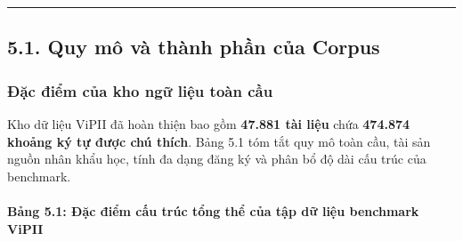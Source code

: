 \documentclass[
  11pt,
  a4paper,
]{article}
\begin{document}
\begin{center}\rule{0.5\linewidth}{0.5pt}\end{center}

\subsection{5.1. Quy mô và thành phần của
Corpus}\label{quy-muxf4-vuxe0-thuxe0nh-phux1ea7n-cux1ee7a-corpus}

\subsubsection{Đặc điểm của kho ngữ liệu toàn
cầu}\label{ux111ux1eb7c-ux111iux1ec3m-cux1ee7a-kho-ngux1eef-liux1ec7u-touxe0n-cux1ea7u}

Kho dữ liệu ViPII đã hoàn thiện bao gồm \textbf{47.881 tài liệu} chứa
\textbf{474.874 khoảng ký tự được chú thích}. Bảng 5.1 tóm tắt quy mô
toàn cầu, tài sản nguồn nhân khẩu học, tính đa dạng đăng ký và phân bổ
độ dài cấu trúc của benchmark.

\paragraph{Bảng 5.1: Đặc điểm cấu trúc tổng thể của tập dữ liệu
benchmark
ViPII}\label{bux1ea3ng-5.1-ux111ux1eb7c-ux111iux1ec3m-cux1ea5u-truxfac-tux1ed5ng-thux1ec3-cux1ee7a-tux1eadp-dux1eef-liux1ec7u-benchmark-vipii}
\end{document}

